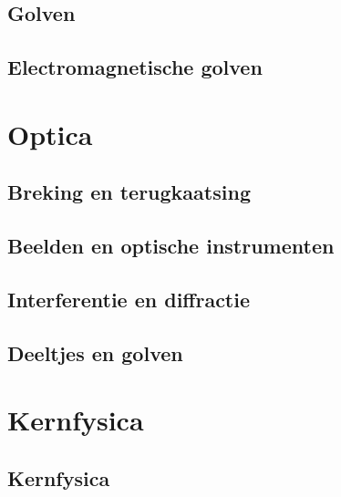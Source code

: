 \documentclass[12pt]{report}
\begin{document}
\chapter{Golven}

\chapter{Electromagnetische golven}

\part{Optica}

\chapter{Breking en terugkaatsing}

\chapter{Beelden en optische instrumenten}

\chapter{Interferentie en diffractie}

\chapter{Deeltjes en golven}

\part{Kernfysica}
\chapter{Kernfysica}
\end{document}
